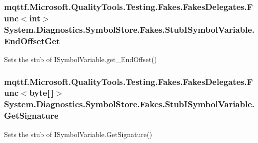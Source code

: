 \hypertarget{class_system_1_1_diagnostics_1_1_symbol_store_1_1_fakes_1_1_stub_i_symbol_variable_ab0721803b37df6e176a81b22db53d0ec}{
\subsubsection[{End\-Offset\-Get}]{\setlength{\rightskip}{0pt plus 5cm}mqttf.\-Microsoft.\-Quality\-Tools.\-Testing.\-Fakes.\-Fakes\-Delegates.\-Func$<$int$>$ System.\-Diagnostics.\-Symbol\-Store.\-Fakes.\-Stub\-I\-Symbol\-Variable.\-End\-Offset\-Get}}\label{class_system_1_1_diagnostics_1_1_symbol_store_1_1_fakes_1_1_stub_i_symbol_variable_ab0721803b37df6e176a81b22db53d0ec}


Sets the stub of I\-Symbol\-Variable.\-get\-\_\-\-End\-Offset()

\hypertarget{class_system_1_1_diagnostics_1_1_symbol_store_1_1_fakes_1_1_stub_i_symbol_variable_a8f7ad29eba6fde3a481ca54d01c0f4d3}{
\subsubsection[{Get\-Signature}]{\setlength{\rightskip}{0pt plus 5cm}mqttf.\-Microsoft.\-Quality\-Tools.\-Testing.\-Fakes.\-Fakes\-Delegates.\-Func$<$byte\mbox{[}$\,$\mbox{]}$>$ System.\-Diagnostics.\-Symbol\-Store.\-Fakes.\-Stub\-I\-Symbol\-Variable.\-Get\-Signature}}\label{class_system_1_1_diagnostics_1_1_symbol_store_1_1_fakes_1_1_stub_i_symbol_variable_a8f7ad29eba6fde3a481ca54d01c0f4d3}


Sets the stub of I\-Symbol\-Variable.\-Get\-Signature()

